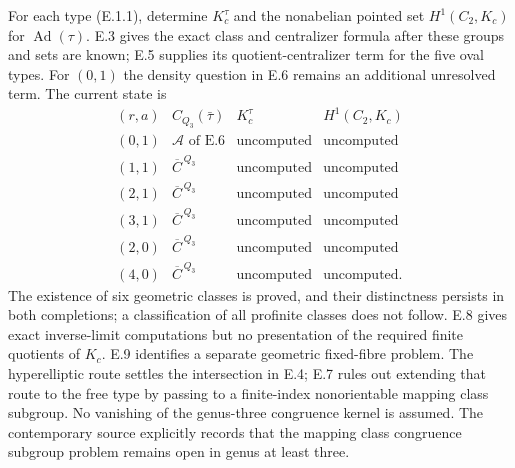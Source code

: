 For each type (E.1.1), determine
$K_c^\tau$ and the nonabelian pointed set
$H^1(C_2,K_c)$ for $\operatorname{Ad}(\tau)$.
E.3 gives the exact class and centralizer formula after
these groups and sets are known; E.5 supplies its
quotient-centralizer term for the five oval types.
For $(0,1)$ the density question in E.6 remains an
additional unresolved term.  The current state is
\[
\begin{array}{c|c|c|c}
 (r,a)&C_{Q_3}(\bar\tau)&K_c^\tau&H^1(C_2,K_c)\\\hline
 (0,1)&\mathcal A\text{ of E.6}&\text{uncomputed}&\text{uncomputed}\\
 (1,1)&\overline C^{\,Q_3}&\text{uncomputed}&\text{uncomputed}\\
 (2,1)&\overline C^{\,Q_3}&\text{uncomputed}&\text{uncomputed}\\
 (3,1)&\overline C^{\,Q_3}&\text{uncomputed}&\text{uncomputed}\\
 (2,0)&\overline C^{\,Q_3}&\text{uncomputed}&\text{uncomputed}\\
 (4,0)&\overline C^{\,Q_3}&\text{uncomputed}&\text{uncomputed}.
\end{array}                                                   \tag{E.10.1}
\]
The existence of six geometric classes is proved, and
their distinctness persists in both completions; a
classification of all profinite classes does not follow.
E.8 gives exact inverse-limit computations but no
presentation of the required finite quotients of $K_c$.
E.9 identifies a separate geometric fixed-fibre problem.
The hyperelliptic route settles the intersection in
E.4; E.7 rules out extending that route to the free
type by passing to a finite-index nonorientable
mapping class subgroup.  No vanishing of the genus-three
congruence kernel is assumed.  The contemporary source
\cite[Problem~19 and the following paragraph]{CEAndrewHenselHughesWade2026}
explicitly records that the mapping class congruence
subgroup problem remains open in genus at least three.

